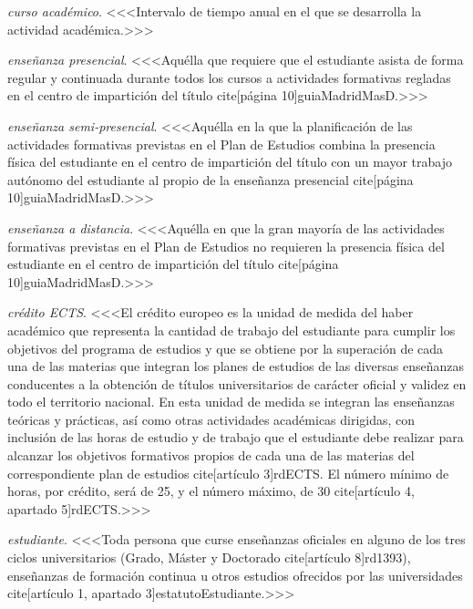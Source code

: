     \item \emph{curso académico}. <<<Intervalo de tiempo anual en el que se desarrolla la actividad académica.>>>

    \item \emph{enseñanza presencial}. <<<Aquélla que requiere que el estudiante asista de forma regular y continuada durante todos los cursos a actividades formativas regladas en el centro de impartición del título cite[página 10]{guiaMadridMasD}.>>>

    \item \emph{enseñanza semi-presencial}. <<<Aquélla en la que la planificación de las actividades formativas previstas en el Plan de Estudios combina la presencia física del estudiante en el centro de impartición del título con un mayor trabajo autónomo del estudiante al propio de la enseñanza presencial cite[página 10]{guiaMadridMasD}.>>>

    \item \emph{enseñanza a distancia}. <<<Aquélla en que la gran mayoría de las actividades formativas previstas en el Plan de Estudios no requieren la presencia física del estudiante en el centro de impartición del título cite[página 10]{guiaMadridMasD}.>>>

    \item \emph{crédito ECTS}. <<<El crédito europeo es la unidad de medida del haber académico que representa la cantidad de trabajo del estudiante para cumplir los objetivos del programa de estudios y que se obtiene por la superación de cada una de las materias que integran los planes de estudios de las diversas enseñanzas conducentes a la obtención de títulos universitarios de carácter oficial y validez en todo el territorio nacional. En esta unidad de medida se integran las enseñanzas teóricas y prácticas, así como otras actividades académicas dirigidas, con inclusión de las horas de estudio y de trabajo que el estudiante debe realizar para alcanzar los objetivos formativos propios de cada una de las materias del correspondiente plan de estudios cite[artículo 3]{rdECTS}. El número mínimo de horas, por crédito, será de 25, y el número máximo, de 30 cite[artículo 4, apartado 5]{rdECTS}.>>>

    \item \emph{estudiante}. <<<Toda  persona  que  curse  enseñanzas  oficiales en alguno de los tres ciclos universitarios (Grado, Máster y Doctorado cite[artículo 8]{rd1393}), enseñanzas de formación continua u otros estudios ofrecidos por las universidades cite[artículo 1, apartado 3]{estatutoEstudiante}.>>>

